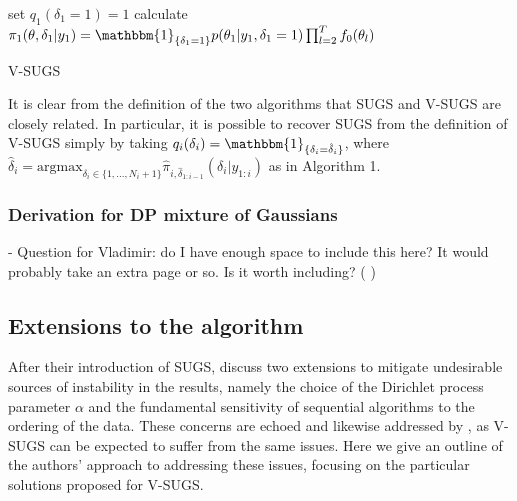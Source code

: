 \documentclass{uwstat572}
\newcommand{\vmcomment}[1]{({\color{blue}{VM's comment:}} \textbf{\color{blue}{#1}})}
\begin{document}
\begin{algorithm}[H]
 set $q_1(\delta_1 = 1) = 1$ \;
 calculate $\pi_1(\theta,\delta_1 | y_1) =  \mathbbm{1}_{\{\delta_1 = 1\}} p(\theta_1 | y_1,\delta_1 = 1)\prod_{l=2}^T f_0(\theta_l)$ \;
 \caption{V-SUGS}
\end{algorithm}
\medskip

It is clear from the definition of the two algorithms that SUGS and V-SUGS are closely related. In particular, it is possible to recover SUGS from the definition of V-SUGS simply by taking $q_i(\delta_i) = \mathbbm{1}_{\{\delta_i = \hat{\delta}_i\}}$, where $\hat{\delta}_i = \mathrm{argmax}_{\delta_i \in \{1,...,N_i+1\}} \hat{\pi}_{i,\hat{\delta}_{1:i-1}}(\delta_i | y_{1:i})$ as in Algorithm 1.

\subsubsection{Derivation for DP mixture of Gaussians}

- Question for Vladimir: do I have enough space to include this here? It would probably take an extra page or so. Is it worth including?
\vmcomment{Variational bit does seem a bit abstract without showing how it works on a concrete example, so I'd say yet. So of your math above can be presented more economically by inlining or splitting equations over fewer lines, so I think you should be able to find space.}

\subsection{Extensions to the algorithm}

After their introduction of SUGS, \cite{wang} discuss two extensions to mitigate undesirable sources of instability in the results, namely the choice of the Dirichlet process parameter $\alpha$ and the fundamental sensitivity of sequential algorithms to the ordering of the data.  These concerns are echoed and likewise addressed by \cite{zhang}, as V-SUGS can be expected to suffer from the same issues. Here we give an outline of the authors' approach to addressing these issues, focusing on the particular solutions proposed for V-SUGS.
\end{document}
